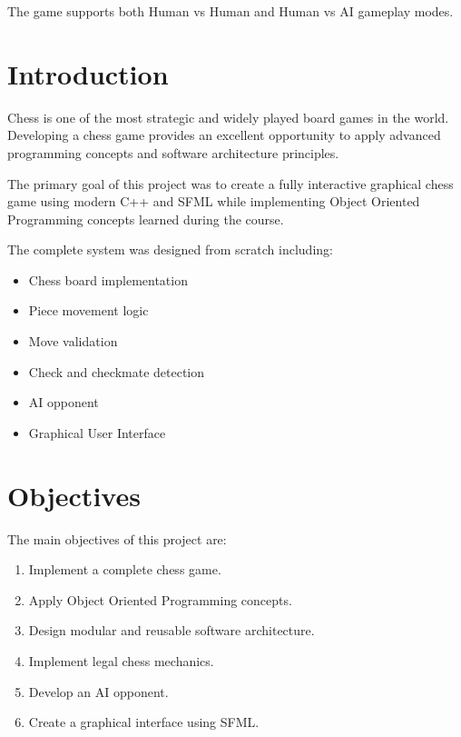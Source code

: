 \documentclass[11pt]{article}
\begin{document}
The game supports both Human vs Human and Human vs AI gameplay modes.


\section{Introduction}

Chess is one of the most strategic and widely played board games in the world. Developing a chess game provides an excellent opportunity to apply advanced programming concepts and software architecture principles.

The primary goal of this project was to create a fully interactive graphical chess game using modern C++ and SFML while implementing Object Oriented Programming concepts learned during the course.

The complete system was designed from scratch including:

\begin{itemize}
    \item Chess board implementation
    \item Piece movement logic
    \item Move validation
    \item Check and checkmate detection
    \item AI opponent
    \item Graphical User Interface
\end{itemize}


\section{Objectives}

The main objectives of this project are:

\begin{enumerate}
    \item Implement a complete chess game.
    \item Apply Object Oriented Programming concepts.
    \item Design modular and reusable software architecture.
    \item Implement legal chess mechanics.
    \item Develop an AI opponent.
    \item Create a graphical interface using SFML.
\end{enumerate}
\end{document}
